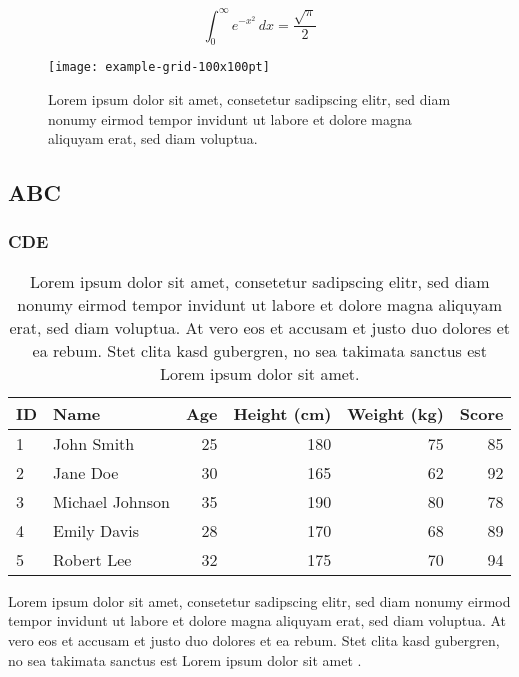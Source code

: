 \documentclass[letter]{bilevelorg}
\begin{document}
\lipsum[1-3]

\[
\int_{0}^{\infty} e^{-x^2} \, dx = \frac{\sqrt{\pi}}{2}
\]

\lipsum[1-3]

\begin{figure}
	\centering
	\texttt{[image: example-grid-100x100pt]}
	\caption{
Lorem ipsum dolor sit amet, consetetur sadipscing elitr, sed diam nonumy eirmod tempor invidunt ut labore et dolore magna aliquyam erat, sed diam voluptua.
}
\end{figure}

\subsection{ABC}

\lipsum[1]

\subsubsection{CDE}


\begin{table*}[!t]
  \centering
  \caption{
Lorem ipsum dolor sit amet, consetetur sadipscing elitr, sed diam nonumy eirmod tempor invidunt ut labore et dolore magna aliquyam erat, sed diam voluptua. At vero eos et accusam et justo duo dolores et ea rebum. Stet clita kasd gubergren, no sea takimata sanctus est Lorem ipsum dolor sit amet.
}
  \label{tab:larger}
  \begin{tabular}{llrrrr}
    \toprule
    \textbf{ID} & \textbf{Name} & \textbf{Age} & \textbf{Height (cm)} & \textbf{Weight (kg)} & \textbf{Score} \\
    \midrule
    1 & John Smith & 25 & 180 & 75 & 85 \\
    2 & Jane Doe & 30 & 165 & 62 & 92 \\
    3 & Michael Johnson & 35 & 190 & 80 & 78 \\
    4 & Emily Davis & 28 & 170 & 68 & 89 \\
    5 & Robert Lee & 32 & 175 & 70 & 94 \\
    \bottomrule
  \end{tabular}
\end{table*}



\lipsum[1-3]


\lipsum 


Lorem ipsum dolor sit amet, consetetur sadipscing elitr, sed diam nonumy eirmod tempor invidunt ut labore et dolore magna aliquyam erat, sed diam voluptua. At vero eos et accusam et justo duo dolores et ea rebum. Stet clita kasd gubergren, no sea takimata sanctus est Lorem ipsum dolor sit amet \cite{zhang2012solving,deb2010efficient,zhang2013solving}.




\end{document}
